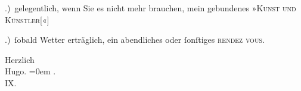 .) gelegentlich, wenn Sie es nicht mehr brauchen, mein gebundenes »\textsc{Kunst und Künstler}{[}«{]}\pend
           
.) ſobald Wetter erträglich, ein abendliches oder{ }ſonſtiges \textsc{rendez vous}.\pend
           
\pstart
           Herzlich{\\[\baselineskip]}\spacefill\mbox{Hugo.}\pend
           \leftskip=0em{}
.{\\}IX.\pend
           \endnumbering{}  \newcommand{\dateiname}{L01450}\newcommand{\titel}{Hugo von Hofmannsthal an Arthur Schnitzler, 27. 9. 1904}\newcommand{\editorInnen}{Martin Anton Müller und Gerd-Hermann Susen}
